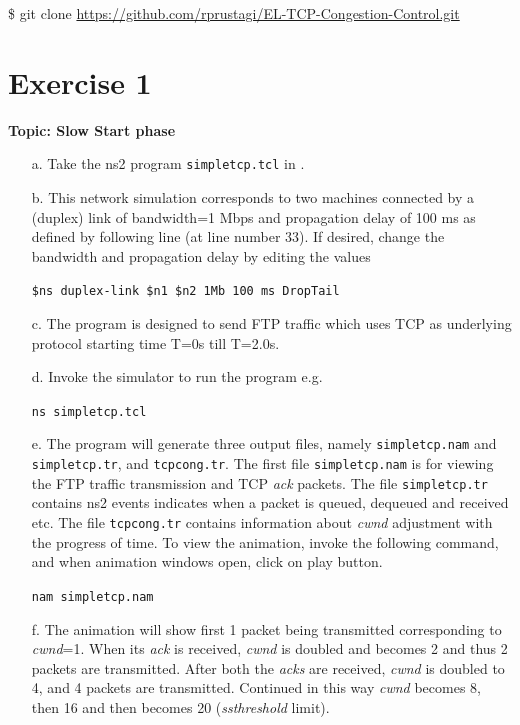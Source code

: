 \begin{multicols}{2}
 \$ git clone \url{https://github.com/rprustagi/EL-TCP-Congestion-Control.git}

\setcounter{section}{0}
\section*{Exercise 1}\label{chap2-exe01}

\textbf{Topic: Slow Start phase}

\begin{itemize}

\item[a.] Take the ns2 program \texttt{simpletcp.tcl} in \cite{art2-key12}.

\item[b.] This network simulation corresponds to two machines connected by a (duplex) link of bandwidth=1 Mbps and propagation delay of 100 ms as defined by following line (at line number 33). If desired, change the bandwidth and propagation delay by editing the values 

\texttt{\$ns duplex-link \$n1 \$n2 1Mb 100 ms DropTail}

\item[c.] The program is designed to send FTP traffic which uses TCP as underlying protocol starting time T=0s till T=2.0s.

\item[d.] Invoke the simulator to run the program e.g.

\texttt{ns simpletcp.tcl}

\item[e.] The program will generate three output files, namely \texttt{simpletcp.nam} and \texttt{simpletcp.tr}, and \texttt{tcpcong.tr}. The first file \texttt{simpletcp.nam} is for viewing the FTP traffic transmission and TCP \textit{ack} packets. The file \texttt{simpletcp.tr} contains ns2 events indicates when a packet is queued, dequeued and received etc. The file \texttt{tcpcong.tr} contains information about \textit{cwnd} adjustment with the progress of time. To view the animation, invoke the following command, and when animation windows open, click on play button.

\texttt{nam simpletcp.nam}

\item[f.] The animation will show first 1 packet being transmitted corresponding to \textit{cwnd}=1. When its \textit{ack} is received, \textit{cwnd} is doubled and becomes 2 and thus 2 packets are transmitted. After both the \textit{acks} are received, \textit{cwnd} is doubled to 4, and 4 packets are transmitted. Continued in this way \textit{cwnd} becomes 8, then 16 and then becomes 20 (\textit{ssthreshold} limit).


\end{itemize}
\end{multicols}
